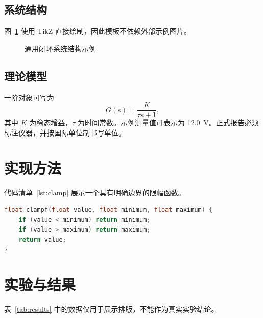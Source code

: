 \documentclass[12pt,fontset=fandol]{ctexart}
\begin{document}
\subsection{系统结构}
图~\ref{fig:flow} 使用 TikZ 直接绘制，因此模板不依赖外部示例图片。

\begin{figure}[htbp]
  \centering
  \caption{通用闭环系统结构示例}\label{fig:flow}
\end{figure}

\subsection{理论模型}
一阶对象可写为
\begin{equation}
  G(s)=\frac{K}{\tau s+1},
  \label{eq:first-order}
\end{equation}
其中 $K$ 为稳态增益，$\tau$ 为时间常数。示例测量值可表示为 \qty{12.0}{\volt}。正式报告必须标注仪器，并按国际单位制书写单位\cite{bipm2019si}。

\section{实现方法}
代码清单~\ref{lst:clamp} 展示一个具有明确边界的限幅函数。

\begin{lstlisting}[language=C,caption={限幅函数示例},label={lst:clamp}]
float clampf(float value, float minimum, float maximum) {
    if (value < minimum) return minimum;
    if (value > maximum) return maximum;
    return value;
}
\end{lstlisting}

\section{实验与结果}
表~\ref{tab:results} 中的数据仅用于展示排版，不能作为真实实验结论。
\end{document}
